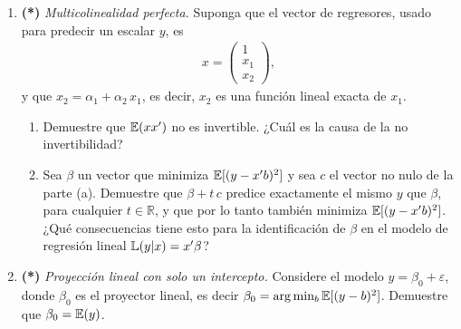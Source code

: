 \documentclass[letterpaper,11pt]{article}
\begin{document}
\begin{enumerate}[itemsep=1.2em]
\item \textbf{(*)} \emph{Multicolinealidad perfecta.} Suponga que el vector de regresores,
    usado para predecir un escalar $y$, es
    \begin{align*}
    x = \begin{pmatrix} 1 \\ x_1 \\ x_2 \end{pmatrix},
    \end{align*}
    y que $x_2 = \alpha_1 + \alpha_2\, x_1$, es decir, $x_2$ es una función lineal exacta de $x_1$.
    \begin{enumerate}
        \item Demuestre que $\operatorname{\mathbb{E}}(xx')$ no es invertible. ¿Cuál es la causa de la no invertibilidad?
        \item Sea $\beta$ un vector que minimiza $\operatorname{\mathbb{E}}[(y-x'b)^2]$ y sea $c$ el vector no
              nulo de la parte (a). Demuestre que $\beta+t\,c$ predice exactamente el mismo $y$
              que $\beta$, para cualquier $t\in\mathbb{R}$, y que por lo tanto también minimiza
              $\operatorname{\mathbb{E}}[(y-x'b)^2]$. ¿Qué consecuencias tiene esto para la identificación de $\beta$ en
              el modelo de regresión lineal $\operatorname{\mathbb{L}}(y|x)=x'\beta$?
    \end{enumerate}

\item \textbf{(*)} \emph{Proyección lineal con solo un intercepto.} Considere el modelo
    $y=\beta_0+\varepsilon$, donde $\beta_0$ es el proyector lineal, es decir
    $\beta_0=\arg\min_b \operatorname{\mathbb{E}}[(y-b)^2]$. Demuestre que $\beta_0=\operatorname{\mathbb{E}}(y)$.

\end{enumerate}
\end{document}
